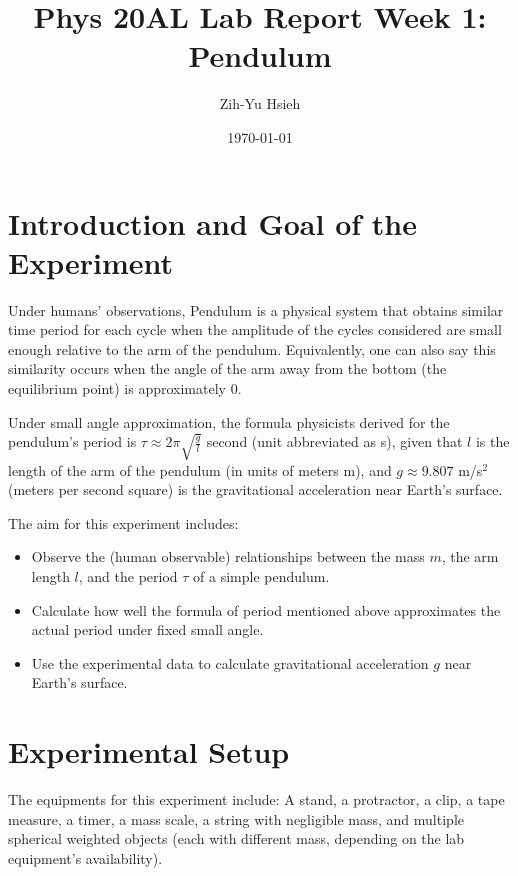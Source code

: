 \documentclass{article}
\title{Phys 20AL Lab Report Week 1: Pendulum}
\author{Zih-Yu Hsieh}
\date{\today}
\begin{document}
\maketitle

\tableofcontents

\hfil

\section{Introduction and Goal of the Experiment}
Under humans' observations, Pendulum is a physical system that obtains similar time period for each cycle when the amplitude of the cycles considered are small enough relative to the arm of the pendulum. Equivalently, one can also say this similarity occurs when the angle of the arm away from the bottom (the equilibrium point) is approximately $0$.

Under small angle approximation, the formula physicists derived for the pendulum's period is $\tau\approx 2\pi\sqrt{\frac{g}{l}}$ second (unit abbreviated as s), given that $l$ is the length of the arm of the pendulum (in units of meters m), and $g \approx 9.807$ m/s$^2$ (meters per second square) is the gravitational acceleration near Earth's surface.

The aim for this experiment includes:
\begin{itemize}
    \item Observe the (human observable) relationships between the mass $m$, the arm length $l$, and the period $\tau$ of a simple pendulum.
    \item Calculate how well the formula of period mentioned above approximates the actual period under fixed small angle.
    \item Use the experimental data to calculate gravitational acceleration $g$ near Earth's surface.
\end{itemize}

\pagebreak

\section{Experimental Setup}
The equipments for this experiment include: A stand, a protractor, a clip, a tape measure, a timer, a mass scale, a string with negligible mass, and multiple spherical weighted objects (each with different mass, depending on the lab equipment's availability).
\end{document}
